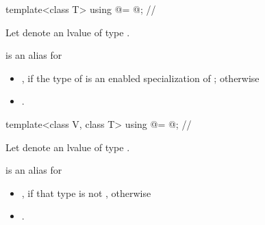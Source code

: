 \begin{itemdecl}
template<class T> using @\deducedsimd@ = @\seebelow@; // \expos
\end{itemdecl}
\begin{itemdescr}
  \pnum Let  denote an lvalue of type .

  \pnum {} is an alias for
  \begin{itemize}

    \item {},
      if the type of  is an enabled specialization of ;
      otherwise

    \item {}.
  \end{itemize}
\end{itemdescr}

\begin{itemdecl}
template<class V, class T> using @\makecompatiblesimdt@ = @\seebelow@; // \expos
\end{itemdecl}
\begin{itemdescr}
  \pnum
  Let  denote an lvalue of type .

  \pnum {} is an alias for
  \begin{itemize}
    \item {}, if that type is not , otherwise
    \item {}.
  \end{itemize}
\end{itemdescr}

